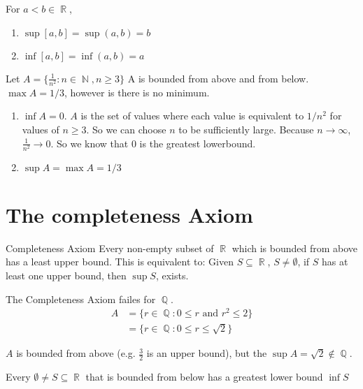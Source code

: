 \documentclass[a4paper, 11pt]{article}
\DeclareMathOperator{\N}{\mathbb{N}}
\DeclareMathOperator{\R}{\mathbb{R}}
\DeclareMathOperator{\Q}{\mathbb{Q}}
\begin{document}
\begin{example}
For $a < b \in \R$,
\begin{enumerate}
  \item $\sup[a, b] = \sup(a, b) = b$
  \item $\inf[a, b] = \inf(a, b) = a$
\end{enumerate}
\end{example}

\begin{example}
Let $A = \lbrace \frac{1}{n^{2}}: n \in \N, n\geq 3  \rbrace$ A is bounded from above and from below.
$\max A = 1 / 3$, however is there is no minimum.

\begin{enumerate}
  \item $\inf A = 0$. $A$ is the set of values where each value is equivalent to $1/n^2$ for values of 
  $n\geq 3$. So we can choose $n$ to be sufficiently large. Because $n \rightarrow \infty$,
  $\frac{1}{n^2} \rightarrow 0$. So we know that 0 is the greatest lowerbound.
  \item $\sup A = \max A = 1/3$
\end{enumerate}
\end{example}

\section{The completeness Axiom}
\begin{definition}{Completeness Axiom}
Every non-empty subset of $\R$ which is bounded from above has a least upper bound. This is equivalent
to: Given $S \subseteq \R$, $S \neq \emptyset$, if $S$ has at least one upper bound, then $\sup S$, exists.
\end{definition}

\begin{remark}
The Completeness Axiom failes for $\Q$.
\begin{align*}
  A &= \lbrace r \in \Q: 0 \leq r \text{ and } r^2 \leq 2 \rbrace \\
  &= \lbrace r \in \Q: 0 \leq r \leq \sqrt{2} \rbrace 
\end{align*}
\end{remark}
$A$ is bounded from above (e.g. $\frac{3}{2}$ is an upper bound), but the $\sup A = \sqrt{2}\not\in \Q$.

\begin{corollary}
Every $\emptyset \neq S \subseteq \R$ that is bounded from below has a greatest lower bound $\inf S$
\end{corollary}
\end{document}
